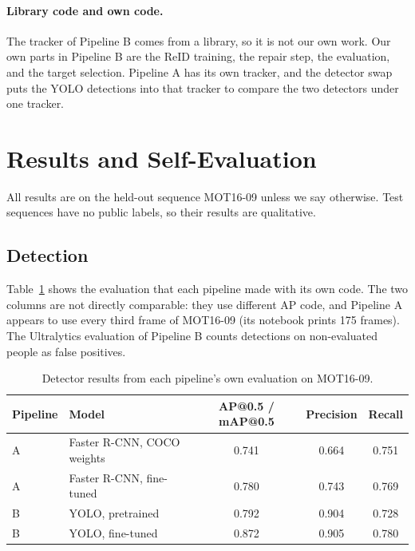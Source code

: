 \documentclass[11pt,letterpaper]{article}
\begin{document}
\paragraph{Library code and own code.}
The tracker of Pipeline B comes from a library, so it is not our own work.
Our own parts in Pipeline B are the ReID training, the repair step, the evaluation, and the target selection.
Pipeline A has its own tracker, and the detector swap puts the YOLO detections into that tracker to compare the two detectors under one tracker.

\section{Results and Self-Evaluation}\label{sec:results}
All results are on the held-out sequence MOT16-09 unless we say otherwise.
Test sequences have no public labels, so their results are qualitative.

\subsection{Detection}\label{sec:detection}
Table~\ref{tab:detown} shows the evaluation that each pipeline made with its own code.
The two columns are not directly comparable: they use different AP code, and Pipeline A appears to use every third frame of MOT16-09 (its notebook prints 175 frames).
The Ultralytics evaluation of Pipeline B counts detections on non-evaluated people as false positives.

\begin{table}[ht]
\centering\small
\caption{Detector results from each pipeline's own evaluation on MOT16-09.}\label{tab:detown}
\begin{tabular}{llccc}
\toprule
Pipeline & Model & AP@0.5 / mAP@0.5 & Precision & Recall \\
\midrule
A & Faster R-CNN, COCO weights & 0.741 & 0.664 & 0.751 \\
A & Faster R-CNN, fine-tuned & 0.780 & 0.743 & 0.769 \\
B & YOLO, pretrained & 0.792 & 0.904 & 0.728 \\
B & YOLO, fine-tuned & 0.872 & 0.905 & 0.780 \\
\bottomrule
\end{tabular}
\end{table}
\end{document}
